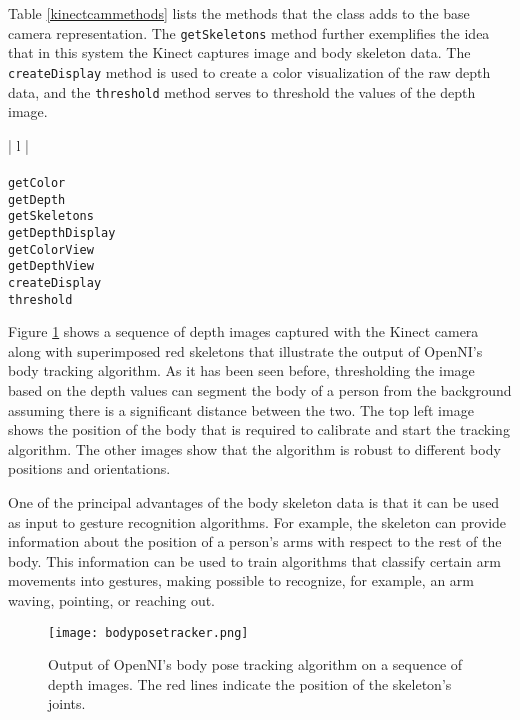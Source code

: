 Table \ref{kinectcammethods} lists the methods that the \KinectCam{} class adds to the base camera
representation. The \texttt{get\-Skel\-e\-tons} method further exemplifies the idea that in this system the Kinect
captures image and body skeleton data. The \texttt{cre\-ate\-Dis\-play} method is used to create a color 
visualization of the raw depth data, and the \texttt{thresh\-old} method serves to threshold the values of the
depth image.

\begin{table}[ht]
\caption{Public methods in the \KinectCam{} class}
\begin{center}
\begin{tabular}{| l |}
	\hline 
	 \\
	 \\
	\hline \hline
	\texttt{getColor} \\
	\texttt{getDepth} \\
	\texttt{getSkeletons} \\
	\texttt{getDepthDisplay} \\
	\texttt{getColorView} \\
	\texttt{getDepthView} \\
	\texttt{createDisplay} \\
	\texttt{threshold} \\
	\hline
\end{tabular}
\end{center}
\label{kinectcammethods}
\end{table}

Figure \ref{bodyposetrackersequence} shows a sequence of depth images captured with the Kinect camera
along with superimposed red skeletons that illustrate the output of OpenNI's body tracking algorithm. As it has 
been seen before, thresholding the image based on the depth values can segment the body of a person from 
the background assuming there is a significant distance between the two. The top left image shows the position
of the body that is required to calibrate and start the tracking algorithm. The other images show that the 
algorithm is robust to different body positions and orientations. 

One of the principal advantages of the body skeleton data is that it can be used as input to gesture recognition
algorithms. For example, the skeleton can provide information about the position of a person's arms with 
respect to the rest of the body. This information can be used to train algorithms that classify certain arm 
movements into gestures, making possible to recognize, for example, an arm waving, pointing, or reaching out. 

\begin{figure}[t]
\center
\texttt{[image: bodyposetracker.png]}
\caption[Output of OpenNI's body pose tracking algorithm]{Output of OpenNI's body pose tracking 
algorithm on a sequence of depth images. The red lines indicate the position of the skeleton's joints.}
\label{bodyposetrackersequence}
\end{figure}